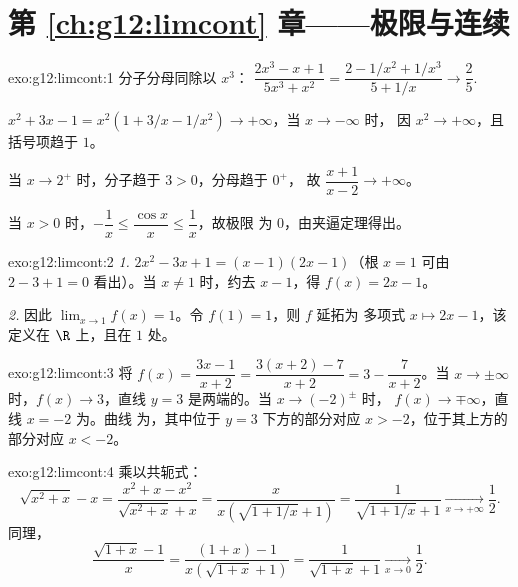 \section*{第 \ref{ch:g12:limcont} 章——极限与连续}

\begin{solution}{exo:g12:limcont:1}
分子分母同除以 $x^3$：
$\dfrac{2x^3 - x + 1}{5x^3 + x^2} = \dfrac{2 - 1/x^2 + 1/x^3}{5 + 1/x}
\to \dfrac{2}{5}$.

$x^2 + 3x - 1 = x^2(1 + 3/x - 1/x^2) \to +\infty$，当 $x \to -\infty$ 时，
因 $x^2 \to +\infty$，且括号项趋于 $1$。

当 $x \to 2^+$ 时，分子趋于 $3 > 0$，分母趋于 $0^+$，
故 $\dfrac{x+1}{x-2} \to +\infty$。

当 $x > 0$ 时，$-\dfrac1x \leq \dfrac{\cos x}{x} \leq \dfrac1x$，故极限
为 $0$，由夹逼定理得出。
\end{solution}

\begin{solution}{exo:g12:limcont:2}
\emph{1.} $2x^2 - 3x + 1 = (x-1)(2x-1)$（根 $x=1$ 可由
$2 - 3 + 1 = 0$ 看出）。当 $x \neq 1$ 时，约去 $x - 1$，得 $f(x) = 2x - 1$。

\emph{2.} 因此 $\lim_{x\to1} f(x) = 1$。令 $f(1) = 1$，则 $f$ 延拓为
多项式 $x \mapsto 2x-1$，该定义在 $\R$ 上，且在 $1$ 处。
\end{solution}

\begin{solution}{exo:g12:limcont:3}
将 $f(x) = \dfrac{3x - 1}{x + 2} = \dfrac{3(x+2) - 7}{x+2}
= 3 - \dfrac{7}{x+2}$。当 $x \to \pm\infty$ 时，$f(x) \to 3$，直线 $y = 3$
是两端的。当 $x \to (-2)^\pm$ 时，
$f(x) \to \mp\infty$，直线 $x = -2$ 为。曲线
为，其中位于 $y=3$ 下方的部分对应 $x > -2$，位于其上方的部分对应 $x < -2$。
\end{solution}

\begin{solution}{exo:g12:limcont:4}
乘以共轭式：
\[
\sqrt{x^2 + x} - x = \frac{x^2 + x - x^2}{\sqrt{x^2+x} + x}
= \frac{x}{x\left(\sqrt{1 + 1/x} + 1\right)}
= \frac{1}{\sqrt{1 + 1/x} + 1}
\xrightarrow[x\to+\infty]{} \frac{1}{2}.
\]
同理，
\[
\frac{\sqrt{1+x} - 1}{x} = \frac{(1+x) - 1}{x\left(\sqrt{1+x} + 1\right)}
= \frac{1}{\sqrt{1+x} + 1} \xrightarrow[x\to0]{} \frac{1}{2}.
\]
\end{solution}

